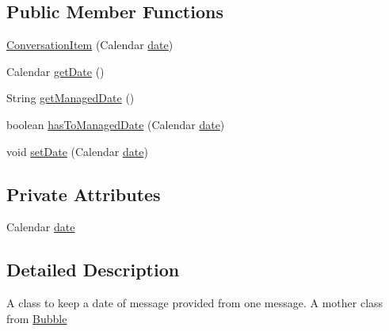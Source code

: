 \subsection*{Public Member Functions}
\begin{DoxyCompactItemize}
\item 
\hyperlink{a00007_ae50f1143e886a4a835296609372ec04a}{Conversation\+Item} (Calendar \hyperlink{a00007_aa713d1025d73543bd4eae313a1868570}{date})
\item 
Calendar \hyperlink{a00007_a91855ab66a4bb5c5e62f947170f29b10}{get\+Date} ()
\item 
String \hyperlink{a00007_aa53441954dd0352c8b8964194365c688}{get\+Managed\+Date} ()
\item 
boolean \hyperlink{a00007_abadf98014647b41c6a96847158d24230}{has\+To\+Managed\+Date} (Calendar \hyperlink{a00007_aa713d1025d73543bd4eae313a1868570}{date})
\item 
void \hyperlink{a00007_a65c1a5dad9225d01d585af72e0c80138}{set\+Date} (Calendar \hyperlink{a00007_aa713d1025d73543bd4eae313a1868570}{date})
\end{DoxyCompactItemize}
\subsection*{Private Attributes}
\begin{DoxyCompactItemize}
\item 
Calendar \hyperlink{a00007_aa713d1025d73543bd4eae313a1868570}{date}
\end{DoxyCompactItemize}


\subsection{Detailed Description}
A class to keep a date of message provided from one message. A mother class from \hyperlink{a00004}{Bubble}

